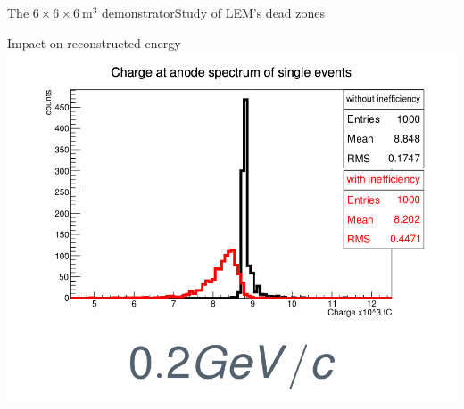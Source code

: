 \documentclass[10pt]{beamer}
\begin{document}
\begin{frame}{The \texorpdfstring{$6 \times 6 \times \SI{6}{\meter\cubed}$}{666}
    		 demonstrator}{Study of LEM's dead zones}
\begin{scriptsize}
\begin{minipage}{0.58\textwidth}
\begin{minipage}{0.48\textwidth}
    			\end{minipage}\hfill
    			\begin{minipage}{0.48\textwidth}
    				\centering
    				Impact on reconstructed energy\\
    				\includegraphics[width=\textwidth]{figures/666/electron.png}
    			\end{minipage}
    		\end{minipage}
    	\end{scriptsize} 
    \end{frame}
    
\end{document}
